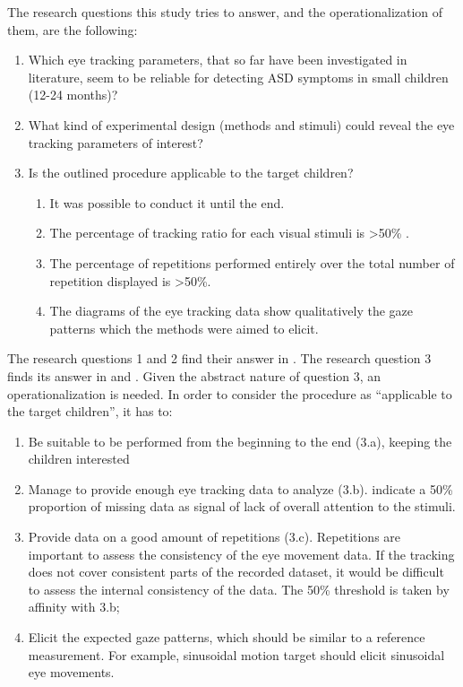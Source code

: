 The research questions this study tries to answer, and the operationalization of them, are the following:
\begin{enumerate}
    \item Which eye tracking parameters, that so far have been investigated in literature, seem to be reliable for detecting ASD symptoms in small children (12-24 months)?
    \item What kind of experimental design (methods and stimuli) could reveal the eye tracking parameters of interest?
    \item Is the outlined procedure applicable to the target children?
    \begin{enumerate} [label=\alph*.]
        \item It was possible to conduct it until the end.
        \item The percentage of tracking ratio for each visual stimuli is >50\% \citep{sasson2012children}.
        \item The percentage of repetitions performed entirely over the total number of repetition displayed is >50\%.
        \item The diagrams of the eye tracking data show qualitatively the gaze patterns which the methods were aimed to elicit.
    \end{enumerate}
\end{enumerate}

The research questions 1 and 2 find their answer in  . The research question 3 finds its answer in  and . Given the abstract nature of question 3, an operationalization is needed. In order to consider the procedure as “applicable to the target children”, it has to:
\begin{enumerate}
    \item Be suitable to be performed from the beginning to the end (3.a), keeping the children interested
    \item Manage to provide enough eye tracking data to analyze (3.b). \cite{sasson2012children} indicate a 50\% proportion of missing data as signal of lack of overall attention to the stimuli.
    \item Provide data on a good amount of repetitions (3.c). Repetitions are important to assess the consistency of the eye movement data. If the tracking does not cover consistent parts of the recorded dataset, it would be difficult to assess the internal consistency of the data. The 50\% threshold is taken by affinity with 3.b;
    \item Elicit the expected gaze patterns, which should be similar to a reference measurement. For example, sinusoidal motion target should elicit sinusoidal eye movements.
\end{enumerate}


